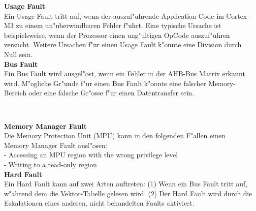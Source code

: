 \vspace{10pt}
\begin{minipage}[t]{9cm}
	\textbf{Usage Fault}\\
	Ein Usage Fault tritt auf, wenn der auszuf"uhrende Application-Code im Cortex-M3 zu einem un"uberwindbaren Fehler f"uhrt. Eine typische Ursache ist beispielsweise, wenn der Prozessor einen ung"ultigen OpCode auszuf"uhren versucht. Weitere Ursachen f"ur einen Usage Fault k"onnte eine Division durch Null sein.\\
	
	\textbf{Bus Fault}\\
	Ein Bus Fault wird ausgel"ost, wenn ein Fehler in der AHB-Bus Matrix erkannt wird. M"ogliche Gr"unde f"ur einen Bus Fault k"onnte eine falscher Memory-Bereich oder eine falsche Gr"osse f"ur einen Datentransfer sein.
\end{minipage}
%
\begin{minipage}[t]{0.5cm}
	\-\
\end{minipage}
%
\begin{minipage}[t]{9cm}
	\textbf{Memory Manager Fault}\\
	Die Memory Protection Unit (MPU) kann in den folgenden F"allen einen Memory
	Manager Fault ausl"osen:\\
	- Accessing an MPU region with the wrong privilege level\\
	- Writing to a read-only region\\
	
	\textbf{Hard Fault}\\
	Ein Hard Fault kann auf zwei Arten auftreten: (1) Wenn ein Bus Fault tritt auf, w"ahrend dem die Vektor-Tabelle gelesen wird. (2) Der Hard Fault wird durch die Eskalationen eines anderen, nicht behandelten Faults aktiviert.
\end{minipage}

\newpage
